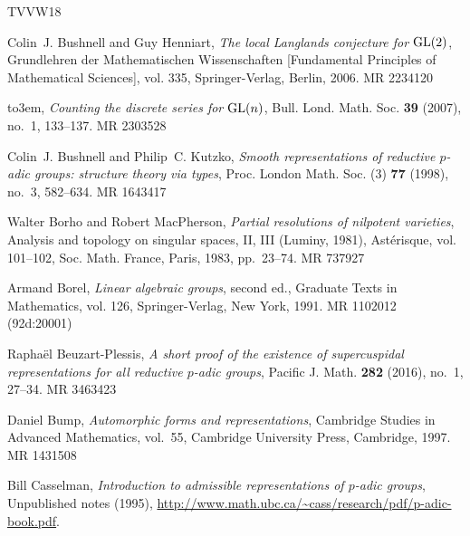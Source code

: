 \documentclass[11pt,reqno]{amsart}
\numberwithin{equation}{section}
\theoremstyle{plain}
\theoremstyle{definition}
\theoremstyle{remark}
\theoremstyle{plain}
\begin{document}


\providecommand{\bysame}{\leavevmode\hbox to3em{\hrulefill}\thinspace}
\providecommand{\MR}{\relax\ifhmode\unskip\space\fi MR }
\providecommand{\MRhref}[2]{%
  \href{http://www.ams.org/mathscinet-getitem?mr=#1}{#2}
}
\providecommand{\href}[2]{#2}
\begin{thebibliography}{TVVW18}

Colin~J. Bushnell and Guy Henniart, \emph{The local {L}anglands conjecture for
  {$\rm GL(2)$}}, Grundlehren der Mathematischen Wissenschaften [Fundamental
  Principles of Mathematical Sciences], vol. 335, Springer-Verlag, Berlin,
  2006. \MR{2234120}

\bysame, \emph{Counting the discrete series for {${\rm GL}(n)$}}, Bull. Lond.
  Math. Soc. \textbf{39} (2007), no.~1, 133--137. \MR{2303528}

Colin~J. Bushnell and Philip~C. Kutzko, \emph{Smooth representations of
  reductive {$p$}-adic groups: structure theory via types}, Proc. London Math.
  Soc. (3) \textbf{77} (1998), no.~3, 582--634. \MR{1643417}

Walter Borho and Robert MacPherson, \emph{Partial resolutions of nilpotent
  varieties}, Analysis and topology on singular spaces, {II}, {III} ({L}uminy,
  1981), Ast\'{e}risque, vol. 101--102, Soc. Math. France, Paris, 1983,
  pp.~23--74. \MR{737927}

Armand Borel, \emph{Linear algebraic groups}, second ed., Graduate Texts in
  Mathematics, vol. 126, Springer-Verlag, New York, 1991. \MR{1102012
  (92d:20001)}

Rapha\"el Beuzart-Plessis, \emph{A short proof of the existence of
  supercuspidal representations for all reductive {$p$}-adic groups}, Pacific
  J. Math. \textbf{282} (2016), no.~1, 27--34. \MR{3463423}

Daniel Bump, \emph{Automorphic forms and representations}, Cambridge Studies in
  Advanced Mathematics, vol.~55, Cambridge University Press, Cambridge, 1997.
  \MR{1431508}

Bill Casselman, \emph{Introduction to admissible representations of $p$-adic
  groups}, Unpublished notes (1995),
  \url{http://www.math.ubc.ca/~cass/research/pdf/p-adic-book.pdf}.


\end{thebibliography}
\end{document}
